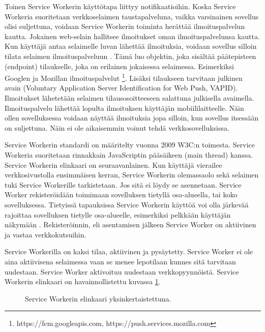 \documentclass{tktltiki}
\begin{document}
Toinen Service Workerin käyttötapa liittyy notifikaatioihin. Koska Service Workeria suoritetaan verkkoselaimen taustapalveluna, vaikka varsinainen sovellus olisi suljettuna, voidaan Service Workerin toiminta herättää ilmoituspalvelun kautta. Jokainen web-selain hallitsee ilmoitukset oman ilmoituspalvelunsa kautta. Kun käyttäjä antaa selaimelle luvan lähettää ilmoituksia, voidaan sovellus silloin tilata selaimen ilmoituspalveluun \cite{Googleb}. Tämä luo objektin, joka sisältää päätepisteen (endpoint) tilaukselle, joka on erilainen jokaisessa selaimessa. Esimerkiksi Googlen ja Mozillan ilmoituspalvelut \footnote{https://fcm.googleapis.com, https://push.services.mozilla.com}. Lisäksi tilaukseen tarvitaan julkinen avain (Voluntary Application Server Identification for Web Push, VAPID). Ilmoitukset lähetetään selaimen tilausosoitteeseen salattuna julkisella avaimella. Ilmoituspalvelu lähettää lopulta ilmoituksen käyttäjän mobiililaitteelle. Näin ollen sovelluksessa voidaan näyttää ilmoituksia jopa silloin, kun sovellus itsessään on suljettuna. Näin ei ole aikaisemmin voinut tehdä verkkosovelluksissa.

Service Workerin standardi on määritelty vuonna 2009 W3C:n toimesta. Service Workeria suoritetaan rinnakkain JavaScriptin pääsäikeen (main thread) kanssa. Service Workerin elinkaari on seuraavanlainen. Kun käyttäjä vierailee verkkosivustolla ensimmäisen kerran, Service Workerin olemassaolo sekä selaimen tuki Service Workerille tarkistetaan. Jos sitä ei löydy se asennetaan. Service Worker rekisteröidään toimimaan sovelluksen tietyllä osa-alueella, tai koko sovelluksessa. Tietyissä tapauksissa Service Workerin käyttöä voi olla järkevää rajoittaa sovelluksen tietylle osa-alueelle, esimerkiksi pelkkään käyttäjän näkymään \cite{hiltunen2018creating}. Rekisteröinnin, eli asentamisen jälkeen Service Worker on aktiivinen ja vastaa verkkokutsuihin. 

Service Workerilla on kaksi tilaa, aktiivinen ja pysäytetty. Service Worker ei ole aina aktiivisena selaimessa vaan se menee lepotilaan kunnes sitä tarvitaan uudestaan. Service Worker aktivoituu uudestaan verkkopyynnöistä. Service Workerin elinkaari on havainnollistettu kuvassa \ref{Service workerin elinkaari}.

\begin{figure}[h]
\begin{center}
\caption{Service Workerin elinkaari yksinkertaistettuna. }
\label{Service workerin elinkaari}
\end{center}
\end{figure}
\end{document}
